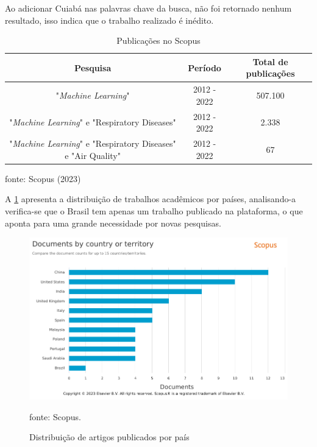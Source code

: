\documentclass[
  12pt,		%
  a4paper,	%
  openright,%
  oneside,	%
  chapter=TITLE,		%
  section=TITLE,		%
  english,	%
  french,	%
  spanish,	%
  brazil	%
]{abntex2}
\begin{document}
    Ao adicionar Cuiabá nas palavras chave da busca, não foi retornado nenhum resultado, isso indica que o trabalho realizado é inédito.

    \begin{table}[ht]
        \centering
        \caption{Publicações no Scopus}
        \label{tabela scopus}
        \begin{tabular}{ccc}
            \hline
            \multicolumn{1}{|c|}{Pesquisa} & \multicolumn{1}{c|}{Período} & \multicolumn{1}{c|}{Total de publicações}\\
            \hline
            "\textit{Machine Learning}" & 2012 - 2022 & 507.100 \\
            "\textit{Machine Learning}" e "Respiratory Diseases" & 2012 - 2022 & 2.338 \\
            "\textit{Machine Learning}" e "Respiratory Diseases"  e "Air Quality" & 2012 - 2022 & 67 \\
            \hline
        \end{tabular}
        \par
        {\small fonte: Scopus (2023)}
    \end{table}

    A \ref*{scopus_country} apresenta a distribuição de trabalhos acadêmicos por países, analisando-a verifica-se que o Brasil tem apenas um trabalho publicado
    na plataforma, o que aponta para uma grande necessidade por novas pesquisas.

    \begin{figure}[ht]
        \centering
        \caption{Distribuição de artigos publicados por país}
        \includegraphics[width=12cm]{../reports/figures/Scopus_Country_ML_RD_AQ.png}
        \label{scopus_country}
        \par
        {\small fonte: Scopus.}
    \end{figure}
\end{document}
